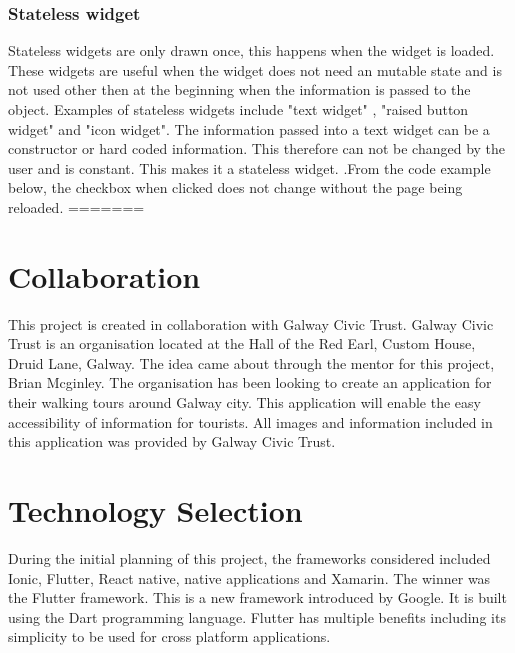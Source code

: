 \subsubsection{Stateless widget}
Stateless widgets are only drawn once, this happens when the widget is loaded. These widgets are useful when the widget does not need an mutable state and is not used other then at the beginning when the information is passed to the object. Examples of stateless widgets include "text widget" , "raised button widget" and "icon widget". The information passed into a text widget can be a constructor or hard coded information. This therefore can not be changed by the user and is constant. This makes it a stateless widget. \cite{birch_2019}.From the code example below, the checkbox when clicked does not change without the page being reloaded.
=======
\section{Collaboration}
This project is created in collaboration with Galway Civic Trust. Galway Civic Trust is an organisation located at the Hall of the Red Earl, Custom House, Druid Lane, Galway. The idea came about through the mentor for this project, Brian Mcginley. The organisation has been looking to create an application for their walking tours around Galway city. This application will enable the easy accessibility of information for tourists. All images and information included in this application was provided by Galway Civic Trust.

\section{Technology Selection}
During the initial planning of this project, the frameworks considered included Ionic, Flutter, React native, native applications and Xamarin. The winner was the Flutter framework. This is a new framework introduced by Google. It is built using the Dart programming language. Flutter has multiple benefits including its simplicity to be used for cross platform applications.



